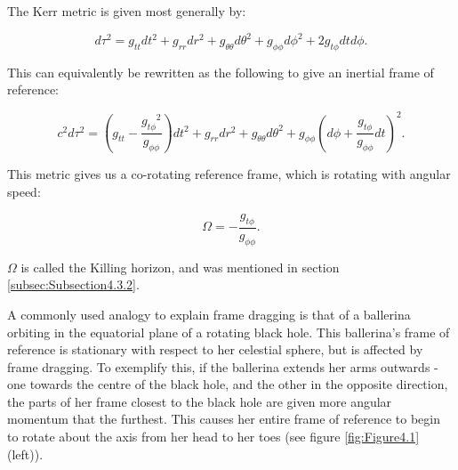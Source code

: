 \documentclass[oneside,openright,frontopenright, singlespacing]{dmathesis}
\begin{document}
\vspace{1em}
	The Kerr metric is given most generally by:

	\[d\tau^2 = g_{tt}dt^2+g_{rr}dr^2+g_{\theta\theta}d\theta^2+g_{\phi\phi}d\phi^2+2g_{t\phi}dtd\phi.\]

	This can equivalently be rewritten as the following to give an inertial frame of reference:

	\[c^2d\tau^2 = \left(g_{tt}-\frac{{g_{t\phi}}^2}{g_{\phi\phi}}\right)dt^2+g_{rr}dr^2+g_{\theta\theta}d\theta^2+g_{\phi\phi}\left(d\phi+\frac{g_{t\phi}}{g_{\phi\phi}}dt\right)^2.\]

	This metric gives us a co-rotating reference frame, which is rotating with angular speed:

	\[\Omega = -\frac{g_{t\phi}}{g_{\phi\phi}}.\]

	$\Omega$ is called the Killing horizon, and was mentioned in section \ref{subsec:Subsection4.3.2}.

\vspace{1em}
	A commonly used analogy to explain frame dragging is that of a ballerina orbiting in the equatorial plane of a rotating black hole. This ballerina's frame of reference is stationary with respect to her celestial sphere, but is affected by frame dragging. To exemplify this, if the ballerina extends her arms outwards - one towards the centre of the black hole, and the other in the opposite direction, the parts of her frame closest to the black hole are given more angular momentum that the furthest. This causes her entire frame of reference to begin to rotate about the axis from her head to her toes (see figure \ref{fig:Figure4.1} (left)).
\end{document}
